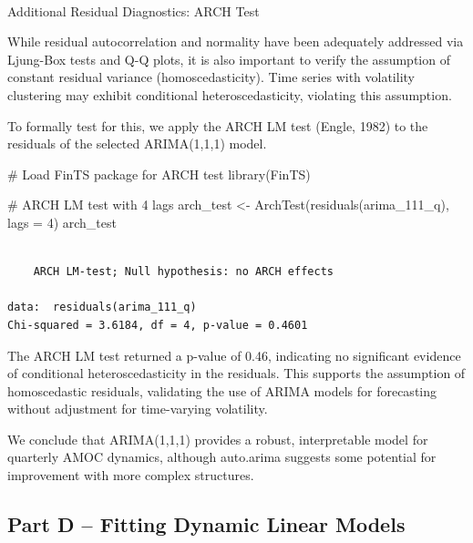 \documentclass[
  11pt,
]{article}
\makeatletter
\let\oldparagraph\paragraph
\renewcommand{\paragraph}{
    \@ifstar
      \xxxParagraphStar
      \xxxParagraphNoStar
  }
\newcommand{\xxxParagraphStar}[1]{\oldparagraph*{#1}\mbox{}}
\newcommand{\xxxParagraphNoStar}[1]{\oldparagraph{#1}\mbox{}}
\newenvironment{Shaded}{\begin{snugshade}}{\end{snugshade}}
\newcommand{\AttributeTok}[1]{\textcolor[rgb]{0.40,0.45,0.13}{#1}}
\newcommand{\CommentTok}[1]{\textcolor[rgb]{0.37,0.37,0.37}{#1}}
\newcommand{\DecValTok}[1]{\textcolor[rgb]{0.68,0.00,0.00}{#1}}
\newcommand{\FunctionTok}[1]{\textcolor[rgb]{0.28,0.35,0.67}{#1}}
\newcommand{\NormalTok}[1]{\textcolor[rgb]{0.00,0.23,0.31}{#1}}
\newcommand{\OtherTok}[1]{\textcolor[rgb]{0.00,0.23,0.31}{#1}}
\makeatother
\begin{document}
\paragraph{Additional Residual Diagnostics: ARCH
Test}\label{additional-residual-diagnostics-arch-test}

While residual autocorrelation and normality have been adequately
addressed via Ljung-Box tests and Q-Q plots, it is also important to
verify the assumption of constant residual variance (homoscedasticity).
Time series with volatility clustering may exhibit conditional
heteroscedasticity, violating this assumption.

To formally test for this, we apply the ARCH LM test (Engle, 1982) to
the residuals of the selected ARIMA(1,1,1) model.

\begin{Shaded}
\begin{Highlighting}[]
\CommentTok{\# Load FinTS package for ARCH test}
\FunctionTok{library}\NormalTok{(FinTS)}

\CommentTok{\# ARCH LM test with 4 lags}
\NormalTok{arch\_test }\OtherTok{\textless{}{-}} \FunctionTok{ArchTest}\NormalTok{(}\FunctionTok{residuals}\NormalTok{(arima\_111\_q), }\AttributeTok{lags =} \DecValTok{4}\NormalTok{)}
\NormalTok{arch\_test}
\end{Highlighting}
\end{Shaded}

\begin{verbatim}

    ARCH LM-test; Null hypothesis: no ARCH effects

data:  residuals(arima_111_q)
Chi-squared = 3.6184, df = 4, p-value = 0.4601
\end{verbatim}

The ARCH LM test returned a p-value of 0.46, indicating no significant
evidence of conditional heteroscedasticity in the residuals. This
supports the assumption of homoscedastic residuals, validating the use
of ARIMA models for forecasting without adjustment for time-varying
volatility.

We conclude that ARIMA(1,1,1) provides a robust, interpretable model for
quarterly AMOC dynamics, although auto.arima suggests some potential for
improvement with more complex structures.

\subsection{Part D -- Fitting Dynamic Linear
Models}\label{part-d-fitting-dynamic-linear-models}
\end{document}
